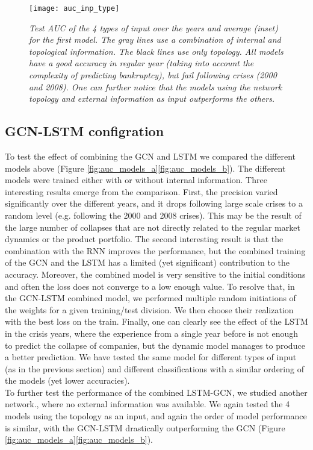 \begin{figure}[h!]
    \texttt{[image: auc\_inp\_type]}
    \centering
    \caption{\textit{Test AUC of the 4 types of input over the years and average (inset) for the first model. The gray lines use a combination of internal and topological information. The black lines use only topology. All models have a good accuracy in regular year (taking into account the complexity of predicting bankruptcy), but fail following crises (2000 and 2008). One can further notice that the models using the network topology and external information as input outperforms the others.}}
    \label{fig:auc_inp_type}
\end{figure}

\subsection{GCN-LSTM configration}
To test the effect of combining the GCN and LSTM we compared the different models above (Figure \ref{fig:auc_models_a}\ref{fig:auc_models_b}). The different models were trained either with or without internal information. Three interesting results emerge from the comparison. First, the precision varied significantly over the different years, and it drops following large scale crises to a random level (e.g. following the 2000 and 2008 crises). This may be the result of the large number of collapses that are not directly related to the regular market dynamics or the product portfolio. The second interesting result is that the combination with the RNN improves the performance, but the combined training of the GCN and the LSTM has a limited (yet significant) contribution to the accuracy. Moreover, the combined model is very sensitive to the initial conditions and often the loss does not converge to a low enough value. To resolve that, in the GCN-LSTM combined model, we performed multiple random initiations of the weights for a given training/test division. We then choose their realization with the best loss on the train. Finally, one can clearly see the effect of the LSTM in the crisis years, where the experience from a single year before is not enough to predict the collapse of companies, but the dynamic model manages to produce a better prediction. We have tested the same model for different types of input (as in the previous section) and different classifications with a similar ordering of the models (yet lower accuracies).
\\To further test the performance of the combined LSTM-GCN, we studied another network., where no external information was available. We again tested the 4 models using the topology as an input, and again the order of model performance is similar, with the GCN-LSTM drastically outperforming the GCN (Figure \ref{fig:auc_models_a}\ref{fig:auc_models_b}).

